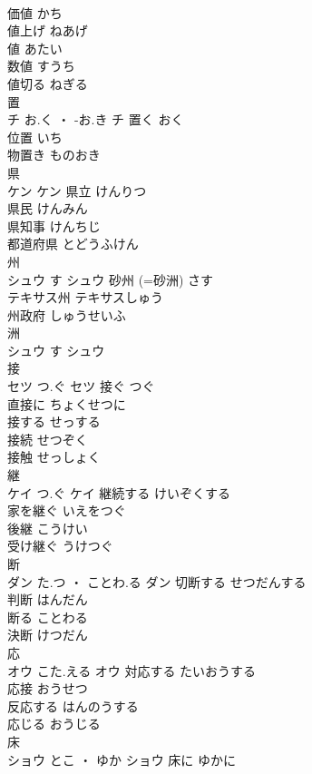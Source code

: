 \documentclass[8pt]{extreport}
\begin{document}
\begin{CJK}{UTF8}{min}
\\	価値	かち	
\\	値上げ	ねあげ	
\\	値	あたい	
\\	数値	すうち	
\\	値切る	ねぎる	
\\	置	
\\	チ	お.く ・ -お.き	チ	置く	おく	
\\	位置	いち	
\\	物置き	ものおき	
\\	県	
\\	ケン		ケン	県立	けんりつ	
\\	県民	けんみん	
\\	県知事	けんちじ	
\\	都道府県	とどうふけん	
\\	州	
\\	シュウ	す	シュウ	砂州 (=砂洲)	さす	
\\	テキサス州	テキサスしゅう	
\\	州政府	しゅうせいふ	
\\	洲	
\\	シュウ	す	シュウ																																			
\\	接	
\\	セツ	つ.ぐ	セツ	接ぐ	つぐ	
\\	直接に	ちょくせつに	
\\	接する	せっする	
\\	接続	せつぞく	
\\	接触	せっしょく	
\\	継	
\\	ケイ	つ.ぐ	ケイ	継続する	けいぞくする	
\\	家を継ぐ	いえをつぐ	
\\	後継	こうけい	
\\	受け継ぐ	うけつぐ	
\\	断	
\\	ダン	た.つ ・ ことわ.る	ダン	切断する	せつだんする	
\\	判断	はんだん	
\\	断る	ことわる	
\\	決断	けつだん	
\\	応	
\\	オウ	こた.える	オウ	対応する	たいおうする	
\\	応接	おうせつ	
\\	反応する	はんのうする	
\\	応じる	おうじる	
\\	床	
\\	ショウ	とこ ・ ゆか	ショウ	床に	ゆかに	

\end{CJK}
\end{document}
